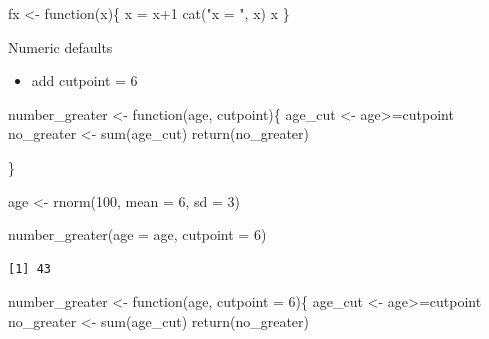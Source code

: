 \documentclass[
  ignorenonframetext,
]{beamer}
\newenvironment{Shaded}{\begin{snugshade}}{\end{snugshade}}
\newcommand{\AttributeTok}[1]{\textcolor[rgb]{0.40,0.45,0.13}{#1}}
\newcommand{\ControlFlowTok}[1]{\textcolor[rgb]{0.00,0.23,0.31}{#1}}
\newcommand{\DecValTok}[1]{\textcolor[rgb]{0.68,0.00,0.00}{#1}}
\newcommand{\FunctionTok}[1]{\textcolor[rgb]{0.28,0.35,0.67}{#1}}
\newcommand{\NormalTok}[1]{\textcolor[rgb]{0.00,0.23,0.31}{#1}}
\newcommand{\OtherTok}[1]{\textcolor[rgb]{0.00,0.23,0.31}{#1}}
\newcommand{\SpecialCharTok}[1]{\textcolor[rgb]{0.37,0.37,0.37}{#1}}
\newcommand{\StringTok}[1]{\textcolor[rgb]{0.13,0.47,0.30}{#1}}
\providecommand{\tightlist}{%
  \setlength{\itemsep}{0pt}\setlength{\parskip}{0pt}}\usepackage{longtable,booktabs,array}
\begin{document}
\begin{frame}[fragile]
\begin{Shaded}
\begin{Highlighting}[]
\NormalTok{fx }\OtherTok{\textless{}{-}} \ControlFlowTok{function}\NormalTok{(x)\{}
\NormalTok{  x }\OtherTok{=}\NormalTok{ x}\SpecialCharTok{+}\DecValTok{1}
  \FunctionTok{cat}\NormalTok{(}\StringTok{"x = "}\NormalTok{, x)}
\NormalTok{  x}
\NormalTok{\}}
\end{Highlighting}
\end{Shaded}

\begin{block}{Numeric defaults}
\protect\hypertarget{numeric-defaults}{}
\begin{itemize}
\tightlist
\item
  add cutpoint = 6
\end{itemize}

\begin{Shaded}
\begin{Highlighting}[]
\NormalTok{number\_greater }\OtherTok{\textless{}{-}} \ControlFlowTok{function}\NormalTok{(age, cutpoint)\{}
\NormalTok{  age\_cut }\OtherTok{\textless{}{-}}\NormalTok{ age}\SpecialCharTok{\textgreater{}=}\NormalTok{cutpoint}
\NormalTok{  no\_greater }\OtherTok{\textless{}{-}} \FunctionTok{sum}\NormalTok{(age\_cut)}
  \FunctionTok{return}\NormalTok{(no\_greater)}
  
\NormalTok{\}}

\NormalTok{age }\OtherTok{\textless{}{-}} \FunctionTok{rnorm}\NormalTok{(}\DecValTok{100}\NormalTok{, }\AttributeTok{mean =} \DecValTok{6}\NormalTok{, }\AttributeTok{sd =} \DecValTok{3}\NormalTok{)}

\FunctionTok{number\_greater}\NormalTok{(}\AttributeTok{age =}\NormalTok{ age, }\AttributeTok{cutpoint =} \DecValTok{6}\NormalTok{)}
\end{Highlighting}
\end{Shaded}

\begin{verbatim}
[1] 43
\end{verbatim}

\begin{Shaded}
\begin{Highlighting}[]
\NormalTok{number\_greater }\OtherTok{\textless{}{-}} \ControlFlowTok{function}\NormalTok{(age, }\AttributeTok{cutpoint =} \DecValTok{6}\NormalTok{)\{}
\NormalTok{  age\_cut }\OtherTok{\textless{}{-}}\NormalTok{ age}\SpecialCharTok{\textgreater{}=}\NormalTok{cutpoint}
\NormalTok{  no\_greater }\OtherTok{\textless{}{-}} \FunctionTok{sum}\NormalTok{(age\_cut)}
  \FunctionTok{return}\NormalTok{(no\_greater)}
  

\end{Highlighting}
\end{Shaded}
\end{block}
\end{frame}
\end{document}
